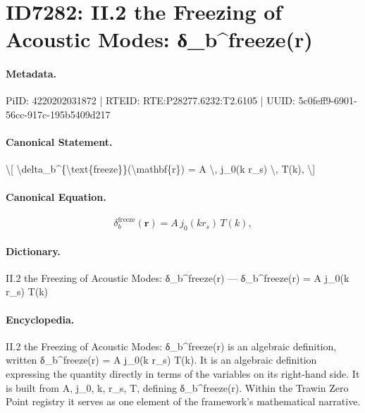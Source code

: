 \section*{ID7282: II.2 the Freezing of Acoustic Modes: δ\_b\textasciicircum{}freeze(r)}
\paragraph{Metadata.}
PiID: 4220202031872 | RTEID: RTE:P28277.6232:T2.6105 | UUID: 5c0feff9-6901-56cc-917c-195b5409d217

\paragraph{Canonical Statement.}
\textbackslash{}[ \textbackslash{}delta\_b\textasciicircum{}\{\textbackslash{}text\{freeze\}\}(\textbackslash{}mathbf\{r\}) = A \textbackslash{}, j\_0(k r\_s) \textbackslash{}, T(k), \textbackslash{}]

\paragraph{Canonical Equation.}
\[
\delta_b^{\text{freeze}}(\mathbf{r}) = A \, j_0(k r_s) \, T(k),
\]

\paragraph{Dictionary.}
II.2 the Freezing of Acoustic Modes: δ\_b\textasciicircum{}freeze(r) — δ\_b\textasciicircum{}freeze(r) = A j\_0(k r\_s) T(k)

\paragraph{Encyclopedia.}
II.2 the Freezing of Acoustic Modes: δ\_b\textasciicircum{}freeze(r) is an algebraic definition, written δ\_b\textasciicircum{}freeze(r) = A j\_0(k r\_s) T(k). It is an algebraic definition expressing the quantity directly in terms of the variables on its right-hand side. It is built from A, j\_0, k, r\_s, T, defining δ\_b\textasciicircum{}freeze(r). Within the Trawin Zero Point registry it serves as one element of the framework's mathematical narrative.
